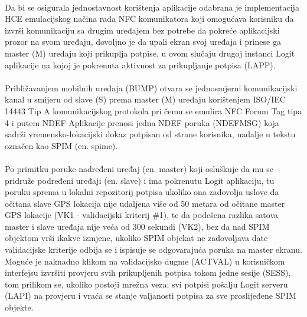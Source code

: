 \paragraph*{}
Da bi se osigurala jednostavnost korištenja aplikacije odabrana je implementacija HCE emulacijskog načina rada NFC komunikatora koji omogućava korisniku da izvrši komunikaciju sa drugim uređajem bez potrebe da pokreće aplikacijski prozor na svom uređaju, dovoljno je da upali ekran svoj uređaja i prinese ga master (M) uređaju koji prikuplja potpise, u ovom slučaju drugoj instanci Logit aplikacije na kojoj je pokrenuta aktivnost za prikupljanje potpisa (LAPP).

\paragraph*{}
Približavanjem mobilnih uređaja (BUMP) otvara se jednosmjerni komunikacijski kanal u smijeru od slave (S) prema master (M) uređaju korištenjem ISO/IEC 14443 Tip A komunikacijskog protokola pri čemu se emulira NFC Forum Tag tipa 4 i putem NDEF Aplikacije prenosi jedna NDEF poruka (NDEFMSG) koja sadrži vremensko-lokacijski dokaz potpisan od strane korisnika, nadalje u tekstu označen kao SPIM (en. spime)\cite{bruces}.

\paragraph*{}
Po primitku poruke nadređeni uređaj (en. master) koji osluškuje da mu se pridruže podređeni uređaji (en. slave) i ima pokrenutu Logit aplikaciju, tu poruku sprema u lokalni repozitorij potpisa ukoliko ona zadovolja uslove da očitana slave GPS lokacija nije udaljena više od 50 metara od očitane master GPS lokacije (VK1 - validacijski kriterij \#1), te da podešena razlika satova master i slave uređaja nije veća od 300 sekundi (VK2), bez da nad SPIM objektom vrši ikakve izmjene, ukoliko SPIM objekat ne zadovoljava date validacijske kriterije odbija se i ispisuje se odgovarajuća poruka na master ekranu. Moguće je naknadno klikom na validacijsko dugme (ACTVAL) u korisničkom interfejsu izvršiti provjeru svih prikupljenih potpisa tokom jedne sesije (SESS), tom prilikom se, ukoliko postoji mrežna veza; svi potpisi pošalju Logit serveru (LAPI) na provjeru i vraća se stanje valjanosti potpisa za sve proslijeđene SPIM objekte.

